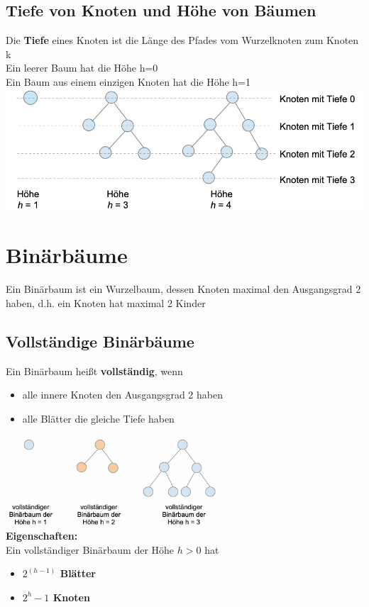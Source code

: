 \documentclass{scrreprt}
\begin{document}
\subsection{Tiefe von Knoten und Höhe von Bäumen}
Die \textbf{Tiefe} eines Knoten ist die Länge des Pfades vom Wurzelknoten zum Knoten k
\\Ein leerer Baum hat die Höhe h=0
\\Ein Baum aus einem einzigen Knoten hat die Höhe h=1\\
\includegraphics[width=1\textwidth]{"graphics/hoehe"}
\section{Binärbäume}
Ein Binärbaum ist ein Wurzelbaum, dessen Knoten maximal den Ausgangsgrad 2 haben,
d.h. ein Knoten hat maximal 2 Kinder
\subsection{Vollständige Binärbäume}
Ein Binärbaum heißt \textbf{vollständig}, wenn
\begin{itemize}
    \item alle innere Knoten den Ausgangsgrad 2 haben
    \item alle Blätter die gleiche Tiefe haben
\end{itemize}
\includegraphics[width=0.6\textwidth]{"graphics/vollBin"}
\\\textbf{Eigenschaften:}
\\Ein vollständiger Binärbaum der Höhe $h>0$ hat
\begin{itemize}
    \item \textbf{$2^{(h-1)}$ Blätter}
    \item \textbf{$2^{h}-1$ Knoten}
\end{itemize}
\end{document}
